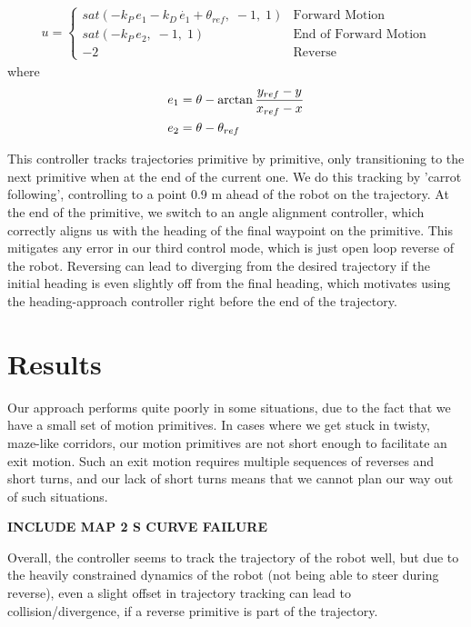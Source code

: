 \documentclass{article}
\begin{document}
\begin{align*}
u =
\begin{cases}
sat(-k_P\,e_1 - k_D\,\dot{e_1} + \theta_{ref},\; -1,\; 1) & \text{Forward Motion}\\
sat(-k_P\,e_2,\; -1,\; 1) & \text{End of Forward Motion}\\
-2 & \text{Reverse}
\end{cases}
\end{align*}
where 
\begin{align*}
\centering
e_1 &= \theta - \arctan{\frac{y_{ref} - y}{x_{ref} - x}}\\
e_2 &= \theta - \theta_{ref}
\end{align*}

This controller tracks trajectories primitive by primitive, only transitioning to the next primitive when at the end of the current one. We do this tracking by 'carrot following', controlling to a point 0.9 m ahead of the robot on the trajectory. At the end of the primitive, we switch to an angle alignment controller, which correctly aligns us with the heading of the final waypoint on the primitive. This mitigates any error in our third control mode, which is just open loop reverse of the robot. Reversing can lead to diverging from the desired trajectory if the initial heading is even slightly off from the final heading, which motivates using the heading-approach controller right before the end of the trajectory.

\section{Results}



Our approach performs quite poorly in some situations, due to the fact that we have a small set of motion primitives. In cases where we get stuck in twisty, maze-like corridors, our motion primitives are not short enough to facilitate an exit motion. Such an exit motion requires multiple sequences of reverses and short turns, and our lack of short turns means that we cannot plan our way out of such situations.

\textbf{INCLUDE MAP 2 S CURVE FAILURE}

Overall, the controller seems to track the trajectory of the robot well, but due to the heavily constrained dynamics of the robot (not being able to steer during reverse), even a slight offset in trajectory tracking can lead to collision/divergence, if a reverse primitive is part of the trajectory.
\end{document}
